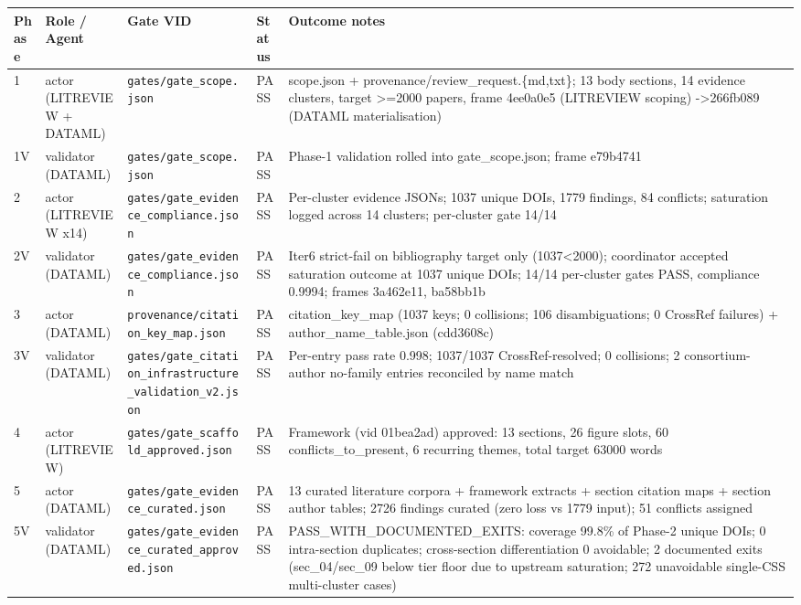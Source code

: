 \documentclass[11pt]{article}
\begin{document}
\bigskip\noindent
\begin{tabular}{p{}p{}p{}p{}p{}}
\toprule
Phase & Role / Agent & Gate VID & Status & Outcome notes \\
\hline
1 & actor (LITREVIEW + DATAML) & \texttt{gates/gate\_scope.json} & PASS & scope.json + provenance/review\_request.\{md,txt\}; 13 body sections, 14 evidence clusters, target \textgreater =2000 papers, frame 4ee0a0e5 (LITREVIEW scoping) -\textgreater  266fb089 (DATAML materialisation) \\
1V & validator (DATAML) & \texttt{gates/gate\_scope.json} & PASS & Phase-1 validation rolled into gate\_scope.json; frame e79b4741 \\
2 & actor (LITREVIEW x14) & \texttt{gates/gate\_evidence\_compliance.json} & PASS & Per-cluster evidence JSONs; 1037 unique DOIs, 1779 findings, 84 conflicts; saturation logged across 14 clusters; per-cluster gate 14/14 \\
2V & validator (DATAML) & \texttt{gates/gate\_evidence\_compliance.json} & PASS & Iter6 strict-fail on bibliography target only (1037\textless 2000); coordinator accepted saturation outcome at 1037 unique DOIs; 14/14 per-cluster gates PASS, compliance 0.9994; frames 3a462e11, ba58bb1b \\
3 & actor (DATAML) & \texttt{provenance/citation\_key\_map.json} & PASS & citation\_key\_map (1037 keys; 0 collisions; 106 disambiguations; 0 CrossRef failures) + author\_name\_table.json (cdd3608c) \\
3V & validator (DATAML) & \texttt{gates/gate\_citation\_infrastructure\_validation\_v2.json} & PASS & Per-entry pass rate 0.998; 1037/1037 CrossRef-resolved; 0 collisions; 2 consortium-author no-family entries reconciled by name match \\
4 & actor (LITREVIEW) & \texttt{gates/gate\_scaffold\_approved.json} & PASS & Framework (vid 01bea2ad) approved: 13 sections, 26 figure slots, 60 conflicts\_to\_present, 6 recurring themes, total target 63000 words \\
5 & actor (DATAML) & \texttt{gates/gate\_evidence\_curated.json} & PASS & 13 curated literature corpora + framework extracts + section citation maps + section author tables; 2726 findings curated (zero loss vs 1779 input); 51 conflicts assigned \\
5V & validator (DATAML) & \texttt{gates/gate\_evidence\_curated\_approved.json} & PASS & PASS\_WITH\_DOCUMENTED\_EXITS: coverage 99.8\% of Phase-2 unique DOIs; 0 intra-section duplicates; cross-section differentiation 0 avoidable; 2 documented exits (sec\_04/sec\_09 below tier floor due to upstream saturation; 272 unavoidable single-CSS multi-cluster cases) \\

\end{tabular}
\end{document}
